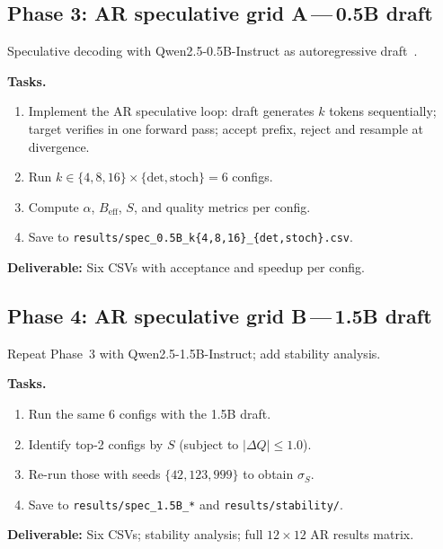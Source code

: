 \subsection{Phase 3: AR speculative grid A\,---\,0.5B draft}

Speculative decoding with Qwen2.5-0.5B-Instruct as autoregressive draft~\cite{Leviathan2023}.

\smallskip\noindent\textbf{Tasks.}
\begin{enumerate}\itemsep0pt
    \item Implement the AR speculative loop: draft generates $k$ tokens sequentially; target verifies in one forward pass; accept prefix, reject and resample at divergence.
    \item Run $k \in \{4,8,16\} \times \{\text{det},\text{stoch}\} = 6$ configs.
    \item Compute $\alpha$, $B_{\text{eff}}$, $S$, and quality metrics per config.
    \item Save to \texttt{results/spec\_0.5B\_k\{4,8,16\}\_\{det,stoch\}.csv}.
\end{enumerate}

\noindent\textbf{Deliverable:} Six CSVs with acceptance and speedup per config.

\subsection{Phase 4: AR speculative grid B\,---\,1.5B draft}

Repeat Phase~3 with Qwen2.5-1.5B-Instruct; add stability analysis.

\smallskip\noindent\textbf{Tasks.}
\begin{enumerate}\itemsep0pt
    \item Run the same 6 configs with the 1.5B draft.
    \item Identify top-2 configs by $S$ (subject to $|\Delta Q| \leq 1.0$).
    \item Re-run those with seeds $\{42, 123, 999\}$ to obtain $\sigma_S$.
    \item Save to \texttt{results/spec\_1.5B\_*} and \texttt{results/stability/}.
\end{enumerate}

\noindent\textbf{Deliverable:} Six CSVs; stability analysis; full $12{\times}12$ AR results matrix.

